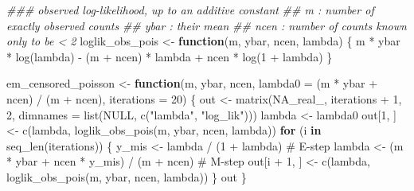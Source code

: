 \documentclass[
  letterpaper,
  DIV=11,
  numbers=noendperiod]{scrreprt}
\newenvironment{Shaded}{\begin{snugshade}}{\end{snugshade}}
\newcommand{\AttributeTok}[1]{\textcolor[rgb]{0.40,0.45,0.13}{#1}}
\newcommand{\CommentTok}[1]{\textcolor[rgb]{0.37,0.37,0.37}{#1}}
\newcommand{\ConstantTok}[1]{\textcolor[rgb]{0.56,0.35,0.01}{#1}}
\newcommand{\ControlFlowTok}[1]{\textcolor[rgb]{0.00,0.23,0.31}{\textbf{#1}}}
\newcommand{\DecValTok}[1]{\textcolor[rgb]{0.68,0.00,0.00}{#1}}
\newcommand{\DocumentationTok}[1]{\textcolor[rgb]{0.37,0.37,0.37}{\textit{#1}}}
\newcommand{\FunctionTok}[1]{\textcolor[rgb]{0.28,0.35,0.67}{#1}}
\newcommand{\NormalTok}[1]{\textcolor[rgb]{0.00,0.23,0.31}{#1}}
\newcommand{\OtherTok}[1]{\textcolor[rgb]{0.00,0.23,0.31}{#1}}
\newcommand{\SpecialCharTok}[1]{\textcolor[rgb]{0.37,0.37,0.37}{#1}}
\newcommand{\StringTok}[1]{\textcolor[rgb]{0.13,0.47,0.30}{#1}}
\begin{document}
\begin{Shaded}
\begin{Highlighting}[]
\DocumentationTok{\#\#\# observed log{-}likelihood, up to an additive constant}
\DocumentationTok{\#\#   m    : number of exactly observed counts}
\DocumentationTok{\#\#   ybar : their mean}
\DocumentationTok{\#\#   ncen : number of counts known only to be \textless{} 2}
\NormalTok{loglik\_obs\_pois }\OtherTok{\textless{}{-}} \ControlFlowTok{function}\NormalTok{(m, ybar, ncen, lambda) \{}
\NormalTok{    m }\SpecialCharTok{*}\NormalTok{ ybar }\SpecialCharTok{*} \FunctionTok{log}\NormalTok{(lambda) }\SpecialCharTok{{-}}\NormalTok{ (m }\SpecialCharTok{+}\NormalTok{ ncen) }\SpecialCharTok{*}\NormalTok{ lambda }\SpecialCharTok{+}\NormalTok{ ncen }\SpecialCharTok{*} \FunctionTok{log}\NormalTok{(}\DecValTok{1} \SpecialCharTok{+}\NormalTok{ lambda)}
\NormalTok{\}}

\NormalTok{em\_censored\_poisson }\OtherTok{\textless{}{-}} \ControlFlowTok{function}\NormalTok{(m, ybar, ncen,}
                                \AttributeTok{lambda0 =}\NormalTok{ (m }\SpecialCharTok{*}\NormalTok{ ybar }\SpecialCharTok{+}\NormalTok{ ncen) }\SpecialCharTok{/}\NormalTok{ (m }\SpecialCharTok{+}\NormalTok{ ncen),}
                                \AttributeTok{iterations =} \DecValTok{20}\NormalTok{) \{}
\NormalTok{    out }\OtherTok{\textless{}{-}} \FunctionTok{matrix}\NormalTok{(}\ConstantTok{NA\_real\_}\NormalTok{, iterations }\SpecialCharTok{+} \DecValTok{1}\NormalTok{, }\DecValTok{2}\NormalTok{,}
                  \AttributeTok{dimnames =} \FunctionTok{list}\NormalTok{(}\ConstantTok{NULL}\NormalTok{, }\FunctionTok{c}\NormalTok{(}\StringTok{"lambda"}\NormalTok{, }\StringTok{"log\_lik"}\NormalTok{)))}
\NormalTok{    lambda }\OtherTok{\textless{}{-}}\NormalTok{ lambda0}
\NormalTok{    out[}\DecValTok{1}\NormalTok{, ] }\OtherTok{\textless{}{-}} \FunctionTok{c}\NormalTok{(lambda, }\FunctionTok{loglik\_obs\_pois}\NormalTok{(m, ybar, ncen, lambda))}
    \ControlFlowTok{for}\NormalTok{ (i }\ControlFlowTok{in} \FunctionTok{seq\_len}\NormalTok{(iterations)) \{}
\NormalTok{        y\_mis  }\OtherTok{\textless{}{-}}\NormalTok{ lambda }\SpecialCharTok{/}\NormalTok{ (}\DecValTok{1} \SpecialCharTok{+}\NormalTok{ lambda)                       }\CommentTok{\# E{-}step}
\NormalTok{        lambda }\OtherTok{\textless{}{-}}\NormalTok{ (m }\SpecialCharTok{*}\NormalTok{ ybar }\SpecialCharTok{+}\NormalTok{ ncen }\SpecialCharTok{*}\NormalTok{ y\_mis) }\SpecialCharTok{/}\NormalTok{ (m }\SpecialCharTok{+}\NormalTok{ ncen)       }\CommentTok{\# M{-}step}
\NormalTok{        out[i }\SpecialCharTok{+} \DecValTok{1}\NormalTok{, ] }\OtherTok{\textless{}{-}} \FunctionTok{c}\NormalTok{(lambda, }\FunctionTok{loglik\_obs\_pois}\NormalTok{(m, ybar, ncen, lambda))}
\NormalTok{    \}}
\NormalTok{    out}
\NormalTok{\}}
\end{Highlighting}
\end{Shaded}
\end{document}
